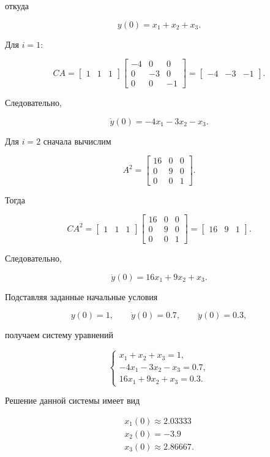 \documentclass[a4paper, 12pt]{article}
\begin{document}
откуда

\[
y(0)=x_1+x_2+x_3.
\]

Для $i=1$:

\[
CA =
\begin{bmatrix}
1 & 1 & 1
\end{bmatrix}
\begin{bmatrix}
-4 & 0 & 0\\
0 & -3 & 0\\
0 & 0 & -1
\end{bmatrix}
=
\begin{bmatrix}
-4 & -3 & -1
\end{bmatrix}.
\]

Следовательно,

\[
\dot{y}(0)
=
-4x_1-3x_2-x_3.
\]

Для $i=2$ сначала вычислим

\[
A^2 =
\begin{bmatrix}
16 & 0 & 0\\
0 & 9 & 0\\
0 & 0 & 1
\end{bmatrix}.
\]

Тогда

\[
CA^2 =
\begin{bmatrix}
1 & 1 & 1
\end{bmatrix}
\begin{bmatrix}
16 & 0 & 0\\
0 & 9 & 0\\
0 & 0 & 1
\end{bmatrix}
=
\begin{bmatrix}
16 & 9 & 1
\end{bmatrix}.
\]

Следовательно,

\[
\ddot{y}(0)
=
16x_1+9x_2+x_3.
\]

Подставляя заданные начальные условия

\[
y(0)=1,\qquad
\dot{y}(0)=0.7,\qquad
\ddot{y}(0)=0.3,
\]

получаем систему уравнений

\[
\begin{cases}
x_1+x_2+x_3=1,\\
-4x_1-3x_2-x_3=0.7,\\
16x_1+9x_2+x_3=0.3.
\end{cases}
\]

Решение данной системы имеет вид

\[
\begin{aligned}
x_1(0) \approx 2.03333 \\
x_2(0) = -3.9 \\
x_3(0) \approx 2.86667.
\end{aligned}
\]
\end{document}

